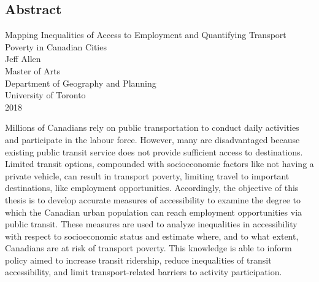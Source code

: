 \documentclass[11 pt, letterpaper]{article}
\begin{document}
{
\begin{center}
\section*{Abstract}
	\singlespacing
	{Mapping Inequalities of Access to Employment and Quantifying Transport Poverty in Canadian Cities}\\[2ex]
	{Jeff Allen}\\
	{Master of Arts}\\
	Department of Geography and Planning\\
	University of Toronto\\
	{2018}\\
\end{center}
Millions of Canadians rely on public transportation to conduct daily activities and participate in the labour force. However, many are disadvantaged because existing public transit service does not provide sufficient access to destinations. Limited transit options, compounded with socioeconomic factors like not having a private vehicle, can result in transport poverty, limiting travel to important destinations, like employment opportunities. Accordingly, the objective of this thesis is to develop accurate measures of accessibility to examine the degree to which the Canadian urban population can reach employment opportunities via public transit. These measures are used to analyze inequalities in accessibility with respect to socioeconomic status and estimate where, and to what extent, Canadians are at risk of transport poverty. This knowledge is able to inform policy aimed to increase transit ridership, reduce inequalities of transit accessibility, and limit transport-related barriers to activity participation.

\vspace{12mm}



\newpage



\tableofcontents


\newpage


\listoffigures


\newpage


}
\end{document}
